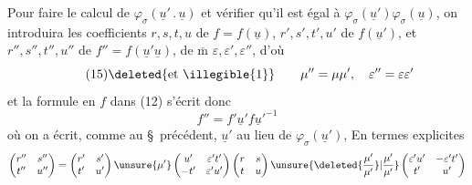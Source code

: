 Pour faire le calcul de $\varphi_{\sigma}(\underline{u}'\mathbin{.}\underline{u})$ et vérifier qu'il est égal à $\varphi_{\sigma}(\underline{u}')\varphi_{\sigma}(\underline{u})$, on  introduira les coefficients $r,s,t,u$ de $f=f(\underline{u})$, $r',s',t',u'$ de  $f(\underline{u}')$, et $r'',s'',t'',u''$ de $f''=f(\underline{u}'\underline{u})$, de $\overline{\mathrm m}$  $\varepsilon,\varepsilon',\varepsilon''$, d'où
\[
\tag{15}
\deleted{\text{et \illegible{1}}}\qquad
\mu''=\mu\mu',\quad \varepsilon''=\varepsilon\varepsilon'
\]
et la formule en $f$ dans (12) s'écrit donc
\[
\tag{16}
f''=f'\underline{u}'f\underline{u}'^{-1}
\]
où on a écrit, comme au \S\ précédent, $\underline{u}'$ au lieu de $\varphi_{\sigma}(\underline{u}')$,  En termes explicites
\[
\begin{pmatrix}r''&s''\\t''&u''\end{pmatrix}
=\begin{pmatrix}r'&s'\\t'&u'\end{pmatrix}
\unsure{\mu'}\begin{pmatrix}u'&\varepsilon't'\\-t'&\varepsilon'u'\end{pmatrix}
\begin{pmatrix}r&s\\t&u\end{pmatrix}
\unsure{\deleted{\frac{\mu'}{\mu'}}|\frac{\mu'}{\mu'}}
\begin{pmatrix}\varepsilon'u'&-\varepsilon't'\\t'&u'\end{pmatrix}
\]


